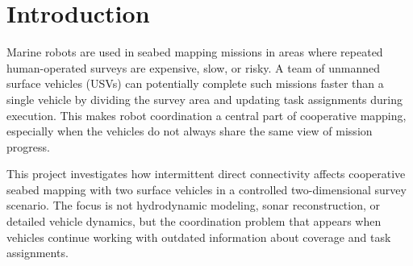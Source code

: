 \section{Introduction}

Marine robots are used in seabed mapping missions in areas where repeated human-operated surveys are expensive, slow, or risky. A team of unmanned surface vehicles (USVs) can potentially complete such missions faster than a single vehicle by dividing the survey area and updating task assignments during execution. This makes robot coordination a central part of cooperative mapping, especially when the vehicles do not always share the same view of mission progress.

This project investigates how intermittent direct connectivity affects cooperative seabed mapping with two surface vehicles in a controlled two-dimensional survey scenario. The focus is not hydrodynamic modeling, sonar reconstruction, or detailed vehicle dynamics, but the coordination problem that appears when vehicles continue working with outdated information about coverage and task assignments.
